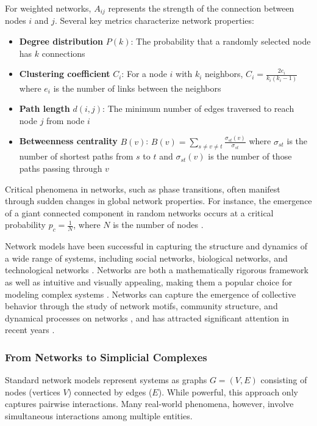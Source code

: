 For weighted networks, $A_{ij}$ represents the strength of the connection between nodes $i$ and $j$. Several key metrics characterize network properties:

\begin{itemize}
    \item \textbf{Degree distribution} $P(k)$: The probability that a randomly selected node has $k$ connections
    \item \textbf{Clustering coefficient} $C_i$: For a node $i$ with $k_i$ neighbors, $C_i = \frac{2e_i}{k_i(k_i-1)}$ where $e_i$ is the number of links between the neighbors
    \item \textbf{Path length} $d(i,j)$: The minimum number of edges traversed to reach node $j$ from node $i$
    \item \textbf{Betweenness centrality} $B(v)$: $B(v) = \sum_{s \neq v \neq t} \frac{\sigma_{st}(v)}{\sigma_{st}}$ where $\sigma_{st}$ is the number of shortest paths from $s$ to $t$ and $\sigma_{st}(v)$ is the number of those paths passing through $v$
\end{itemize}

Critical phenomena in networks, such as phase transitions, often manifest through sudden changes in global network properties. For instance, the emergence of a giant connected component in random networks occurs at a critical probability $p_c = \frac{1}{N}$, where $N$ is the number of nodes \citep{erdos1960evolution}.

Network models have been successful in capturing the structure and dynamics of a wide range of systems, including social networks, biological networks, and technological networks \citep{newman2003structure, albert2002statistical, strogatz2001exploring}. Networks are both a mathematically rigorous framework as well as intuitive and visually appealing, making them a popular choice for modeling complex systems \citep{newman2010networks}. Networks can capture the emergence of collective behavior through the study of network motifs, community structure, and dynamical processes on networks \citep{milo2002network, fortunato2010community, barrat2008dynamical}, and has attracted significant attention in recent years \citep{barabasi2016network}.

\subsubsection{From Networks to Simplicial Complexes}
Standard network models represent systems as graphs $G = (V, E)$ consisting of nodes (vertices $V$) connected by edges ($E$). While powerful, this approach only captures pairwise interactions. Many real-world phenomena, however, involve simultaneous interactions among multiple entities.

